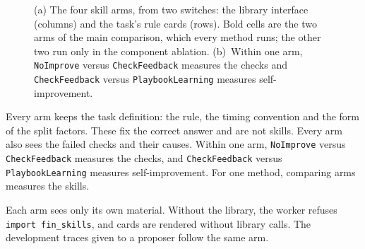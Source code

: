 \begin{figure}[t]
\centering

\caption{(a) The four skill arms, from two switches: the library interface (columns) and the
task's rule cards (rows). Bold cells are the two arms of the main comparison, which every method
runs; the other two run only in the component ablation. (b)~Within one arm, \texttt{NoImprove}
versus \texttt{CheckFeedback} measures the checks and \texttt{CheckFeedback} versus
\texttt{PlaybookLearning} measures self-improvement.}
\label{fig:arms}
\end{figure}

Every arm keeps the task definition: the rule, the timing convention and the form of the split
factors. These fix the correct answer and are not skills. Every arm also sees the failed checks
and their causes. Within one arm, \texttt{NoImprove} versus \texttt{CheckFeedback} measures the
checks, and \texttt{CheckFeedback} versus \texttt{PlaybookLearning} measures self-improvement.
For one method, comparing arms measures the skills.

Each arm sees only its own material. Without the library, the worker refuses
\texttt{import fin\_skills}, and cards are rendered without library calls. The development
traces given to a proposer follow the same arm.
